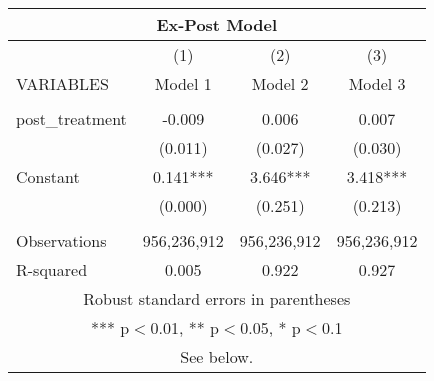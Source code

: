 \begin{tabular}{lccc}
\multicolumn{4}{c}{Ex-Post Model} \\ \hline
 & (1) & (2) & (3) \\
VARIABLES & Model 1 & Model 2 & Model 3 \\ \hline
 &  &  &  \\
post\_treatment & -0.009 & 0.006 & 0.007 \\
 & (0.011) & (0.027) & (0.030) \\
Constant & 0.141*** & 3.646*** & 3.418*** \\
 & (0.000) & (0.251) & (0.213) \\
 &  &  &  \\
Observations & 956,236,912 & 956,236,912 & 956,236,912 \\
 R-squared & 0.005 & 0.922 & 0.927 \\ \hline
\multicolumn{4}{c}{ Robust standard errors in parentheses} \\
\multicolumn{4}{c}{ *** p$<$0.01, ** p$<$0.05, * p$<$0.1} \\
\multicolumn{4}{c}{ See below.} \\
\end{tabular}
